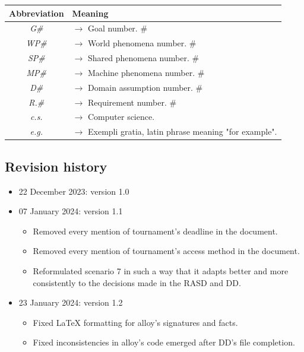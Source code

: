 \documentclass{article}
\begin{document}
{\begin{xltabular}{\textwidth}{ >{\raggedright\arraybackslash}c >{\raggedright\arraybackslash}X }
    \endfirsthead

    \hline
    \textbf{Abbreviation} & \textbf{Meaning} \\
    \hline

    \endhead
    \endfoot
    \endlastfoot

    \textit{G\#} & $\rightarrow$ Goal number. \#
    \\
    \textit{WP\#} & $\rightarrow$ World phenomena number. \#
    \\
    \textit{SP\#} & $\rightarrow$ Shared phenomena number. \#
    \\
    \textit{MP\#} & $\rightarrow$ Machine phenomena number. \#
    \\
    \textit{D\#} & $\rightarrow$ Domain assumption number. \#
    \\
    \textit{R.\#} & $\rightarrow$ Requirement number. \#
    \\
    \textit{c.s.} & $\rightarrow$ Computer science.
    \\
    \textit{e.g.} & $\rightarrow$ Exempli gratia, latin phrase meaning "for example".
\end{xltabular}

\subsection{Revision history}
\begin{itemize}
    \item 22 December 2023: version 1.0
    \item 07 January 2024: version 1.1
      \begin{itemize}
            \item Removed every mention of tournament's deadline in the document.
            \item Removed every mention of tournament's access method in the document.
            \item Reformulated scenario 7 in such a way that it adapts better and more 
            consistently to the decisions made in the RASD and DD.
      \end{itemize}
      \item 23 January 2024: version 1.2
      \begin{itemize}
            \item Fixed LaTeX formatting for alloy's signatures and facts.
            \item Fixed inconsistencies in alloy's code emerged after DD's file completion.
      \end{itemize}
      

\end{itemize}}
\end{document}
